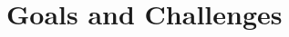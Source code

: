 \documentclass{scrartcl}
\begin{document}












\section{Goals and Challenges}



\end{document}
